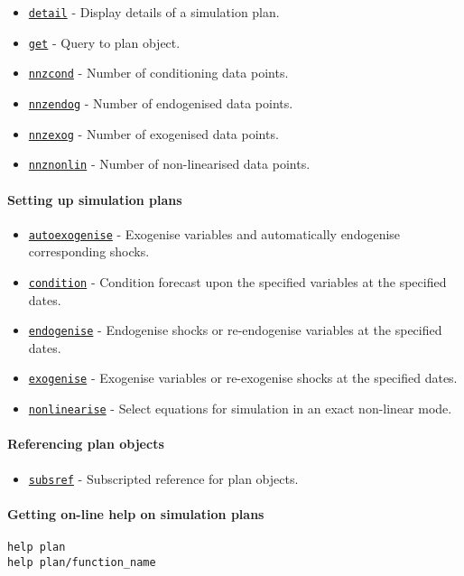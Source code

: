 \begin{itemize}
\itemsep1pt\parskip0pt
\item
  \href{plan/detail}{\texttt{detail}} - Display details of a simulation
  plan.
\item
  \href{plan/get}{\texttt{get}} - Query to plan object.
\item
  \href{plan/nnzcond}{\texttt{nnzcond}} - Number of conditioning data
  points.
\item
  \href{plan/nnzendog}{\texttt{nnzendog}} - Number of endogenised data
  points.
\item
  \href{plan/nnzexog}{\texttt{nnzexog}} - Number of exogenised data
  points.
\item
  \href{plan/nnznonlin}{\texttt{nnznonlin}} - Number of non-linearised
  data points.
\end{itemize}

\paragraph{Setting up simulation
plans}\label{setting-up-simulation-plans}

\begin{itemize}
\itemsep1pt\parskip0pt
\item
  \href{plan/autoexogenise}{\texttt{autoexogenise}} - Exogenise
  variables and automatically endogenise corresponding shocks.
\item
  \href{plan/condition}{\texttt{condition}} - Condition forecast upon
  the specified variables at the specified dates.
\item
  \href{plan/endogenise}{\texttt{endogenise}} - Endogenise shocks or
  re-endogenise variables at the specified dates.
\item
  \href{plan/exogenise}{\texttt{exogenise}} - Exogenise variables or
  re-exogenise shocks at the specified dates.
\item
  \href{plan/nonlinearise}{\texttt{nonlinearise}} - Select equations for
  simulation in an exact non-linear mode.
\end{itemize}

\paragraph{Referencing plan objects}\label{referencing-plan-objects}

\begin{itemize}
\itemsep1pt\parskip0pt
\item
  \href{plan/subsref}{\texttt{subsref}} - Subscripted reference for plan
  objects.
\end{itemize}

\paragraph{Getting on-line help on simulation
plans}\label{getting-on-line-help-on-simulation-plans}

\begin{verbatim}
help plan
help plan/function_name
\end{verbatim}



